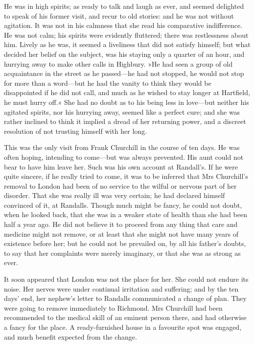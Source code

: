 He was in high spirits; as ready to talk and laugh as ever, and seemed delighted to speak of his former visit, and recur to old stories: and he was not without agitation. It was not in his calmness that she read his comparative indifference. He was not calm; his spirits were evidently fluttered; there was restlessness about him. Lively as he was, it seemed a liveliness that did not satisfy himself; but what decided her belief on the subject, was his staying only a quarter of an hour, and hurrying away to make other calls in Highbury. »He had seen a group of old acquaintance in the street as he passed—he had not stopped, he would not stop for more than a word—but he had the vanity to think they would be disappointed if he did not call, and much as he wished to stay longer at Hartfield, he must hurry off.« She had no doubt as to his being less in love—but neither his agitated spirits, nor his hurrying away, seemed like a perfect cure; and she was rather inclined to think it implied a dread of her returning power, and a discreet resolution of not trusting himself with her long.

This was the only visit from Frank Churchill in the course of ten days. He was often hoping, intending to come—but was always prevented. His aunt could not bear to have him leave her. Such was his own account at Randall's. If he were quite sincere, if he really tried to come, it was to be inferred that Mrs Churchill's removal to London had been of no service to the wilful or nervous part of her disorder. That she was really ill was very certain; he had declared himself convinced of it, at Randalls. Though much might be fancy, he could not doubt, when he looked back, that she was in a weaker state of health than she had been half a year ago. He did not believe it to proceed from any thing that care and medicine might not remove, or at least that she might not have many years of existence before her; but he could not be prevailed on, by all his father's doubts, to say that her complaints were merely imaginary, or that she was as strong as ever.

It soon appeared that London was not the place for her. She could not endure its noise. Her nerves were under continual irritation and suffering; and by the ten days' end, her nephew's letter to Randalls communicated a change of plan. They were going to remove immediately to Richmond. Mrs Churchill had been recommended to the medical skill of an eminent person there, and had otherwise a fancy for the place. A ready-furnished house in a favourite spot was engaged, and much benefit expected from the change.

